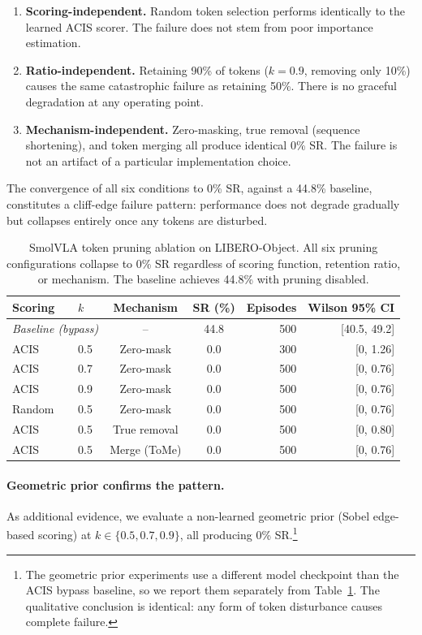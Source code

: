 \begin{enumerate}
    \item \textbf{Scoring-independent.} Random token selection performs identically to the learned ACIS scorer. The failure does not stem from poor importance estimation.
    \item \textbf{Ratio-independent.} Retaining 90\% of tokens ($k{=}0.9$, removing only 10\%) causes the same catastrophic failure as retaining 50\%. There is no graceful degradation at any operating point.
    \item \textbf{Mechanism-independent.} Zero-masking, true removal (sequence shortening), and token merging all produce identical 0\% SR. The failure is not an artifact of a particular implementation choice.
\end{enumerate}

The convergence of all six conditions to 0\% SR, against a 44.8\% baseline, constitutes a cliff-edge failure pattern: performance does not degrade gradually but collapses entirely once any tokens are disturbed.

\begin{table}[t]
\centering
\small
\caption{SmolVLA token pruning ablation on LIBERO-Object. All six pruning configurations collapse to 0\% SR regardless of scoring function, retention ratio, or mechanism. The baseline achieves 44.8\% with pruning disabled.}
\label{tab:smolvla_ablation}
\begin{tabular}{llccrr}
\toprule
Scoring & $k$ & Mechanism & SR (\%) & Episodes & Wilson 95\% CI \\
\midrule
\multicolumn{2}{l}{\textit{Baseline (bypass)}} & -- & 44.8 & 500 & [40.5, 49.2] \\
\midrule
ACIS & 0.5 & Zero-mask & 0.0 & 300 & [0, 1.26] \\
ACIS & 0.7 & Zero-mask & 0.0 & 500 & [0, 0.76] \\
ACIS & 0.9 & Zero-mask & 0.0 & 500 & [0, 0.76] \\
Random & 0.5 & Zero-mask & 0.0 & 500 & [0, 0.76] \\
ACIS & 0.5 & True removal & 0.0 & 500 & [0, 0.80] \\
ACIS & 0.5 & Merge (ToMe) & 0.0 & 500 & [0, 0.76] \\
\bottomrule
\end{tabular}
\end{table}

\paragraph{Geometric prior confirms the pattern.}
As additional evidence, we evaluate a non-learned geometric prior (Sobel edge-based scoring) at $k \in \{0.5, 0.7, 0.9\}$, all producing 0\% SR.\footnote{The geometric prior experiments use a different model checkpoint than the ACIS bypass baseline, so we report them separately from Table~\ref{tab:smolvla_ablation}. The qualitative conclusion is identical: any form of token disturbance causes complete failure.}

